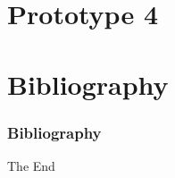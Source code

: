 \documentclass{beamer}
\begin{document}
\section{Prototype 4}

\section{Bibliography}
\begin{frame}[allowframebreaks]
	\frametitle{Bibliography}
	\nocite{*} 
	 
	
\end{frame}


\begin{frame}
\Huge{\centerline{The End}}
\end{frame}

\end{document}
